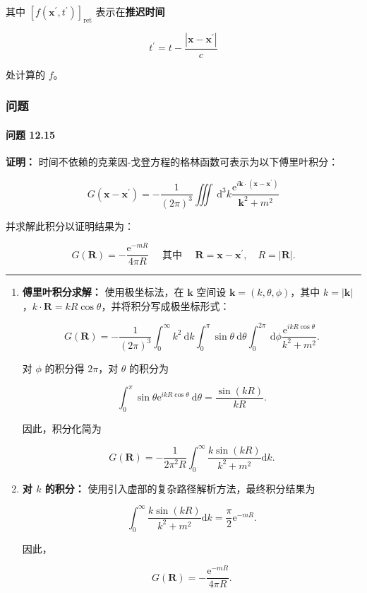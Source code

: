 其中
\(\left[f\left(\mathbf{x}^{\prime}, t^{\prime}\right)\right]_{\text{ret}}\)
表示在\textbf{推迟时间}

\[
t^{\prime}=t-\frac{\left|\mathbf{x}-\mathbf{x}^{\prime}\right|}{c}
\]

处计算的 \(f\)。

\subsubsection{问题}\label{ux95eeux9898-3}

\paragraph{问题 12.15}\label{ux95eeux9898-12.15}

\textbf{证明：}
时间不依赖的克莱因-戈登方程的格林函数可表示为以下傅里叶积分：

\[
G\left(\mathbf{x}-\mathbf{x}^{\prime}\right)=-\frac{1}{(2 \pi)^{3}} \iiint \mathrm{~d}^{3} k \frac{\mathrm{e}^{i \mathbf{k} \cdot\left(\mathbf{x}-\mathbf{x}^{\prime}\right)}}{\mathbf{k}^{2}+m^{2}}
\]

并求解此积分以证明结果为：

\[
G(\mathbf{R})=-\frac{\mathrm{e}^{-m R}}{4 \pi R} \quad \text { 其中 } \quad \mathbf{R}=\mathbf{x}-\mathbf{x}^{\prime}, \quad R=|\mathbf{R}|.
\]

\begin{center}\rule{0.5\linewidth}{0.5pt}\end{center}

\begin{enumerate}
\def\labelenumi{\arabic{enumi}.}
\item
  \textbf{傅里叶积分求解：} 使用极坐标法，在 \(\mathbf{k}\) 空间设
  \(\mathbf{k}=(k, \theta, \phi)\)，其中
  \(k=|\mathbf{k}|\)，\(k \cdot \mathbf{R}=k R \cos\theta\)，并将积分写成极坐标形式：

  \[
  G(\mathbf{R})=-\frac{1}{(2 \pi)^{3}} \int_{0}^{\infty} k^{2} \mathrm{~d} k \int_{0}^{\pi} \sin \theta \mathrm{~d} \theta \int_{0}^{2 \pi} \mathrm{~d} \phi \frac{\mathrm{e}^{i k R \cos \theta}}{k^{2}+m^{2}}.
  \]

  对 \(\phi\) 的积分得 \(2 \pi\)，对 \(\theta\) 的积分为

  \[
  \int_{0}^{\pi} \sin \theta \mathrm{e}^{i k R \cos \theta} \mathrm{~d} \theta = \frac{\sin(k R)}{k R}.
  \]

  因此，积分化简为

  \[
  G(\mathbf{R})=-\frac{1}{2 \pi^{2} R} \int_{0}^{\infty} \frac{k \sin(k R)}{k^{2}+m^{2}} \mathrm{d} k.
  \]
\item
  \textbf{对 \(k\) 的积分：}
  使用引入虚部的复杂路径解析方法，最终积分结果为

  \[
  \int_{0}^{\infty} \frac{k \sin(k R)}{k^{2}+m^{2}} \mathrm{d} k = \frac{\pi}{2} \mathrm{e}^{-m R}.
  \]

  因此，

  \[
  G(\mathbf{R})=-\frac{\mathrm{e}^{-m R}}{4 \pi R}.
  \]
\end{enumerate}

